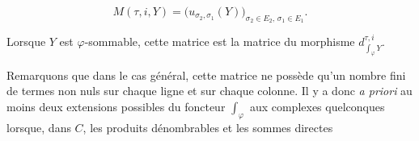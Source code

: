 \begin{equation}
  M(\tau,i,Y)
  =\bigl(u_{\sigma_2,\sigma_1}(Y)\bigr)_
    {\sigma_2\in E_2,\,\sigma_1\in E_1}.
  \tag{2.2.3.2}
\end{equation}

Lorsque $Y$ est $\varphi$-sommable, cette matrice est la matrice du
morphisme $d_{\int_\varphi Y}^{\tau,i}$.

Remarquons que dans le cas général, cette matrice ne possède qu'un nombre
fini de termes non nuls sur chaque ligne et sur chaque colonne. Il y a donc
\emph{a priori} au moins deux extensions possibles du foncteur
$\int_\varphi$ aux complexes quelconques lorsque, dans $C$, les produits
dénombrables et les sommes directes
